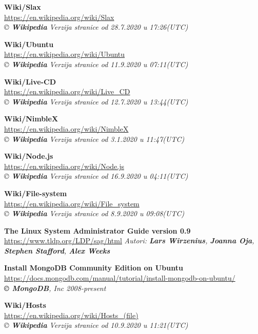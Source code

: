 \documentclass[12pt,vi]{mitthesis}
\begin{document}
\begin{thebibliography}{38}
\textbf{Wiki/Slax}\\
\url{https://en.wikipedia.org/wiki/Slax}\\
\textit{© \textbf{Wikipedia}}
\textit{Verzija stranice od 28.7.2020 u 17:26(UTC)}

\textbf{Wiki/Ubuntu}\\
\url{https://en.wikipedia.org/wiki/Ubuntu}\\
\textit{© \textbf{Wikipedia}}
\textit{Verzija stranice od 11.9.2020 u 07:11(UTC)}

\textbf{Wiki/Live-CD}\\
\url{https://en.wikipedia.org/wiki/Live_CD}\\
\textit{© \textbf{Wikipedia}}
\textit{Verzija stranice od 12.7.2020 u 13:44(UTC)}

\textbf{Wiki/NimbleX}\\
\url{https://en.wikipedia.org/wiki/NimbleX}\\
\textit{© \textbf{Wikipedia}}
\textit{Verzija stranice od 3.1.2020 u 11:47(UTC)}

\textbf{Wiki/Node.js}\\
\url{https://en.wikipedia.org/wiki/Node.js}\\
\textit{© \textbf{Wikipedia}}
\textit{Verzija stranice od 16.9.2020 u 04:11(UTC)}

\textbf{Wiki/File-system}\\
\url{https://en.wikipedia.org/wiki/File_system}\\
\textit{© \textbf{Wikipedia}}
\textit{Verzija stranice od 8.9.2020 u 09:08(UTC)}

\textbf{The Linux System Administrator Guide version 0.9}\\
\url{https://www.tldp.org/LDP/sag/html}
\textit{Autori: \textbf{Lars Wirzenius}, \textbf{Joanna Oja}, \textbf{Stephen Stafford}, \textbf{Alex Weeks}}

\textbf{Install MongoDB Community Edition on Ubuntu}\\
\url{https://docs.mongodb.com/manual/tutorial/install-mongodb-on-ubuntu/}\\
\textit{\textbf{© MongoDB}, Inc 2008-present}

\textbf{Wiki/Hosts}\\
\url{https://en.wikipedia.org/wiki/Hosts_(file)}\\
\textit{© \textbf{Wikipedia}}
\textit{Verzija stranice od 10.9.2020 u 11:21(UTC)}


\end{thebibliography}
\end{document}
